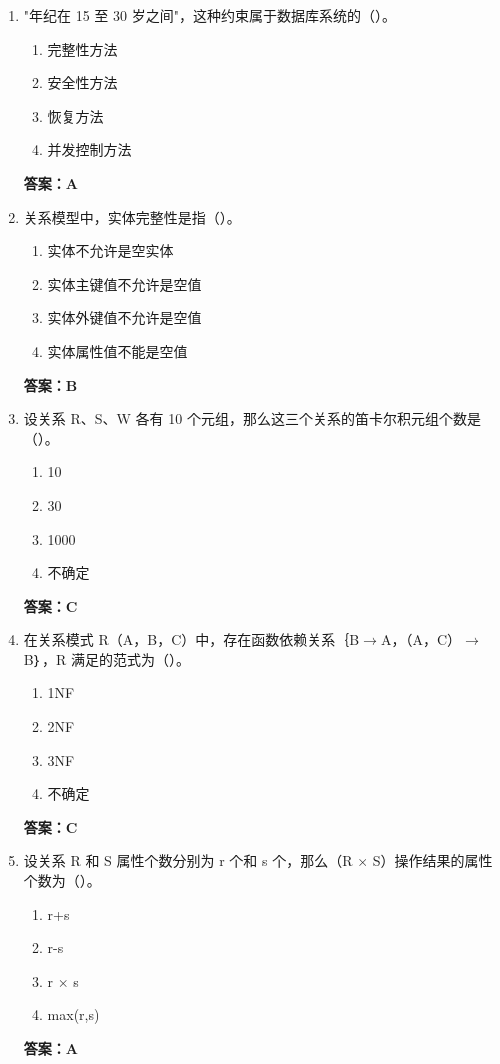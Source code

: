 \documentclass[12pt, a4paper]{article}
\begin{document}
\begin{enumerate}[label=\arabic*.]
	\item "年纪在 15 至 30 岁之间"，这种约束属于数据库系统的（\quad）。
	      \begin{enumerate}
		      \item 完整性方法
		      \item 安全性方法
		      \item 恢复方法
		      \item 并发控制方法
	      \end{enumerate}
	      \textbf{答案：A}

	\item 关系模型中，实体完整性是指（\quad）。
	      \begin{enumerate}
		      \item 实体不允许是空实体
		      \item 实体主键值不允许是空值
		      \item 实体外键值不允许是空值
		      \item 实体属性值不能是空值
	      \end{enumerate}
	      \textbf{答案：B}

	\item 设关系 R、S、W 各有 10 个元组，那么这三个关系的笛卡尔积元组个数是（\quad）。
	      \begin{enumerate}
		      \item 10
		      \item 30
		      \item 1000
		      \item 不确定
	      \end{enumerate}
	      \textbf{答案：C}

	\item 在关系模式 R（A，B，C）中，存在函数依赖关系｛B$\to$A，（A，C）$\to$B｝，R 满足的范式为（\quad）。
	      \begin{enumerate}
		      \item 1NF
		      \item 2NF
		      \item 3NF
		      \item 不确定
	      \end{enumerate}
	      \textbf{答案：C}

	\item 设关系 R 和 S 属性个数分别为 r 个和 s 个，那么（R $\times$ S）操作结果的属性个数为（\quad）。
	      \begin{enumerate}
		      \item r+s
		      \item r-s
		      \item r $\times$ s
		      \item max(r,s)
	      \end{enumerate}
	      \textbf{答案：A}


\end{enumerate}
\end{document}
